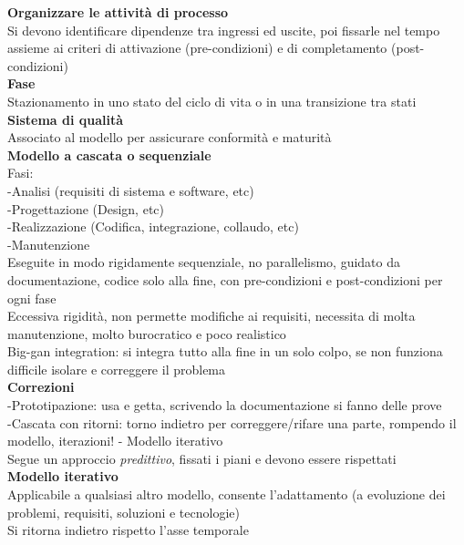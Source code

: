 \documentclass{article}
\begin{document}
		\textbf{Organizzare le attività di processo}\\
		Si devono identificare dipendenze tra ingressi ed uscite, poi fissarle nel tempo assieme ai criteri di attivazione (pre-condizioni) e di completamento (post-condizioni)\\
		
		\textbf{Fase}\\
		Stazionamento in uno stato del ciclo di vita o in una transizione tra stati\\
		
		\textbf{Sistema di qualità}\\
		Associato al modello per assicurare conformità e maturità\\
		
		
		\textbf{Modello a cascata o sequenziale}\\
		Fasi:\\
		-Analisi (requisiti di sistema e software, etc)\\
		-Progettazione (Design, etc)\\
		-Realizzazione (Codifica, integrazione, collaudo, etc)\\
		-Manutenzione\\
		Eseguite in modo rigidamente sequenziale, no parallelismo, guidato da documentazione, codice solo alla fine, con pre-condizioni e post-condizioni per ogni fase\\
		Eccessiva rigidità, non permette modifiche ai requisiti, necessita di molta manutenzione, molto burocratico e poco realistico\\
		Big-gan integration: si integra tutto alla fine in un solo colpo, se non funziona difficile isolare e correggere il problema\\
		\textbf{Correzioni}\\
		-Prototipazione: usa e getta, scrivendo la documentazione si fanno delle prove\\
		-Cascata con ritorni: torno indietro per correggere/rifare una parte, rompendo il modello, iterazioni! - Modello iterativo\\
		Segue un approccio \textit{predittivo}, fissati i piani e devono essere rispettati\\
		
		\textbf{Modello iterativo}\\
		Applicabile a qualsiasi altro modello, consente l'adattamento (a evoluzione dei problemi, requisiti, soluzioni e tecnologie)\\
		Si ritorna indietro rispetto l'asse temporale\\
		
\end{document}
